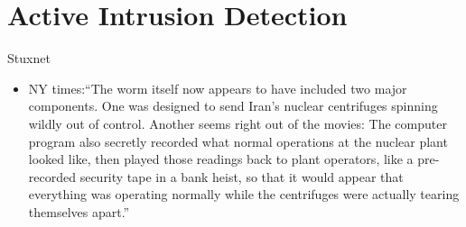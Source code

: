 \documentclass[10pt]{beamer}
\begin{document}

\section{Active Intrusion Detection}

\begin{frame}{Stuxnet}
  \begin{itemize}
    \item NY times:``The worm itself now appears to have included two major components. One was designed to send Iran's nuclear centrifuges spinning wildly out of control. Another seems right out of the movies: The computer program also \alert{secretly recorded what normal operations at the nuclear plant looked like, then played those readings back to plant operators}, like a pre-recorded security tape in a bank heist, so that it would appear that everything was operating normally while the centrifuges were actually tearing themselves apart.''
  \end{itemize}
\end{frame}
\end{document}
